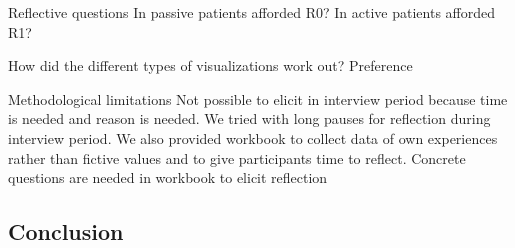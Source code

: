 Reflective questions
In passive patients afforded R0?
In active patients afforded R1?

How did the different types of visualizations work out?
Preference 



Methodological limitations
Not possible to elicit in interview period because time is needed and reason is needed. We tried with long pauses for reflection during interview period. We also provided workbook to collect data of own experiences rather than fictive values and to give participants time to reflect.
Concrete questions are needed in workbook to elicit reflection

\subsection{Conclusion}